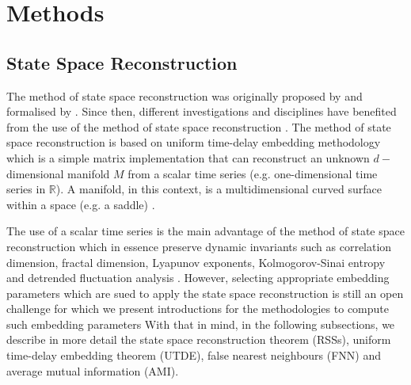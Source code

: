 \documentclass[fleqn,10pt]{wlscirep}
\begin{document}
\section*{Methods}
\subsection*{State Space Reconstruction}
The method of state space reconstruction was originally proposed by 
\cite{packard1980} and formalised by \cite{takens1981}. Since then, different 
investigations and disciplines have benefited from the use of the method of 
state space reconstruction \cite{aguirre2009, stergiou2011, frank2010, 
sama2013, Quintana-Duque2016}. The method of state space reconstruction is 
based on uniform time-delay embedding methodology which is a simple 
matrix implementation that can reconstruct an unknown $d-$dimensional 
manifold $M$ from a scalar time series (e.g. one-dimensional 
time series in $\mathbb{R}$). A manifold, in this context, is a 
multidimensional curved surface within a space (e.g. a saddle) 
\cite{guastello-gregson2011}.

The use of a scalar time series is the main advantage of the method of state 
space reconstruction which in essence preserve dynamic invariants such as 
correlation dimension, fractal dimension, Lyapunov exponents, Kolmogorov-Sinai 
entropy and detrended fluctuation analysis \cite{bradley2015, 
Quintana-Duque2012, Quintana-Duque2013, Quintana-Duque2016, krakovska2015}.
However, selecting appropriate embedding parameters which are sued to apply the 
state space reconstruction is still an open challenge for which we present 
introductions for the methodologies to compute such embedding parameters 
With that in mind, in the following subsections, we describe in more detail 
the state space reconstruction theorem (RSSs), uniform time-delay embedding 
theorem (UTDE), false nearest neighbours (FNN) and average mutual 
information (AMI). 
\end{document}
